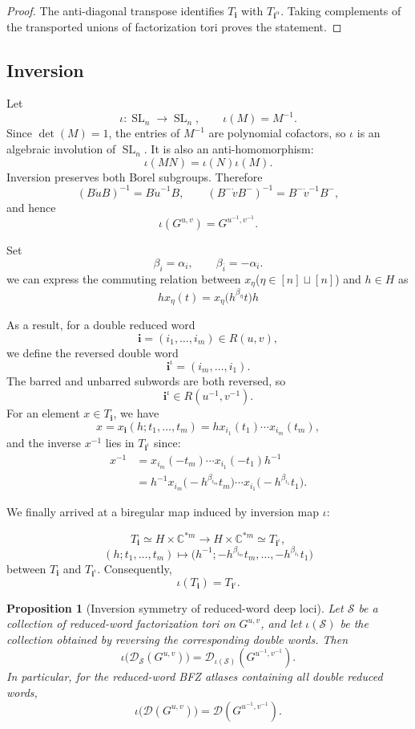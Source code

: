 \documentclass[12pt]{amsart}
\newcommand{\C}{\mathbb C}
\newcommand{\SL}{\operatorname{SL}}
\newcommand{\bi}{\mathbf i}
\newcommand{\cS}{\mathcal S}
\newcommand{\cD}{\mathcal D}
\theoremstyle{plain}
\newtheorem{proposition}[theorem]{Proposition}
\theoremstyle{definition}
\theoremstyle{remark}
\begin{document}
\begin{proof}
The anti-diagonal transpose identifies $T_{\bi}$ with $T_{\bi^\alpha}$.  Taking complements of the transported unions of factorization tori proves the statement.
\end{proof}

\subsection{Inversion}\label{subsec:inversion_symmetry}

Let
\[
   \iota:\SL_n\longrightarrow\SL_n,
   \qquad
   \iota(M)=M^{-1}.
\]
Since $\det(M)=1$, the entries of $M^{-1}$ are polynomial cofactors, so $\iota$ is an algebraic involution of $\SL_n$.  It is also an anti-homomorphism:
\[
   \iota(MN)=\iota(N)\iota(M).
\]
Inversion preserves both Borel subgroups.  Therefore
\[
   (B\dot uB)^{-1}=B\dot u^{-1}B,
   \qquad
   (B^-\dot vB^-)^{-1}=B^-\dot v^{-1}B^-,
\]
and hence
\[
   \iota(G^{u,v})=G^{u^{-1},v^{-1}}.
\]


Set
\[
   \beta_i=\alpha_i,
   \qquad
   \beta_{\bar i}=-\alpha_i.
\]
we can express the commuting relation between $x_\eta$($\eta \in [n]\sqcup [n]$) and $h\in H$ as
\[
   h x_\eta(t)=x_\eta\bigl(h^{\beta_\eta}t\bigr)h
\]


As a result, for a double reduced word
\[
   \bi=(i_1,\ldots,i_m)\in R(u,v),
\]
we define the reversed double word
\[
   \bi^\iota=(i_m,\ldots,i_1).
\]
The barred and unbarred subwords are both reversed, so
\[
   \bi^\iota\in R(u^{-1},v^{-1}).
\]
For an element $x\in T_{\bi}$, we have
\[
   x=x_{\bi}(h;t_1,\ldots,t_m)
   =h x_{i_1}(t_1)\cdots x_{i_m}(t_m),
\]
and the inverse $x^{-1}$ lies in $T_{\bi^\iota}$ since:
\begin{align*}
   x^{-1}
   &=x_{i_m}(-t_m)\cdots x_{i_1}(-t_1)h^{-1}\\
   &=h^{-1}
     x_{i_m}\bigl(-h^{\beta_{i_m}}t_m\bigr)
     \cdots
     x_{i_1}\bigl(-h^{\beta_{i_1}}t_1\bigr).
\end{align*}

We finally arrived at a biregular map induced by inversion map $\iota$:

\[
T_{\bi} \simeq H \times \C^{*m} \longrightarrow H \times \C^{*m} \simeq T_{\bi^\iota},
\]
\[
   (h;t_1,\ldots,t_m)
   \longmapsto
   \bigl(h^{-1};-h^{\beta_{i_m}}t_m,\ldots,
   -h^{\beta_{i_1}}t_1\bigr)
\]
between $T_{\bi}$ and $T_{\bi^\iota}$. Consequently,
\[
   \iota(T_{\bi})=T_{\bi^\iota}.
\]

\begin{proposition}[Inversion symmetry of reduced-word deep loci]
\label{prop:inversion_symmetry}
Let $\cS$ be a collection of reduced-word factorization tori on $G^{u,v}$, and let $\iota(\cS)$ be the collection obtained by reversing the corresponding double words.  Then
\[
   \iota\bigl(\cD_{\cS}(G^{u,v})\bigr)
   =\cD_{\iota(\cS)}(G^{u^{-1},v^{-1}}).
\]
In particular, for the reduced-word BFZ atlases containing all double reduced words,
\[
   \iota\bigl(\cD(G^{u,v})\bigr)
   =\cD(G^{u^{-1},v^{-1}}).
\]
\end{proposition}
\end{document}
